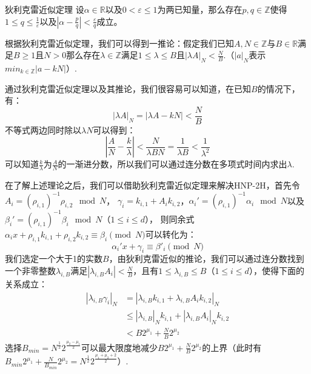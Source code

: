 \documentclass{book}
\numberwithin{equation}{subsubsection}
\begin{document}
\begin{concept}{狄利克雷近似定理}
    设$\alpha\in\mathbb{R}$以及$0<\varepsilon\le1$为两已知量，那么存在$p,q\in\mathbb{Z}$使得$1\le q\le\frac{1}{\varepsilon}$以及$|\alpha-\frac{p}{q}|<\frac{\varepsilon}{q}$成立。
\end{concept}

根据狄利克雷近似定理，我们可以得到一推论：假定我们已知$A,N\in\mathbb{Z}$与$B\in\mathbb{R}$满足$B\ge1$且$N>0$那么存在$\lambda\in\mathbb{Z}$满足$1\le\lambda\le B$且$|\lambda A|_N<\frac{N}{B}$.（$|a|_N$表示$min_{k\in\mathbb{Z}}|a-kN|$）.\par
通过狄利克雷近似定理以及其推论，我们很容易可以知道，在已知$B$的情况下，有：
\begin{equation}
    |\lambda A|_N=|\lambda A - kN|<\frac{N}{B}
    \nonumber
\end{equation}
不等式两边同时除以$\lambda N$可以得到：
\begin{equation}
    \left|\frac{A}{N} - \frac{k}{\lambda}\right|<\frac{N}{\lambda BN}=\frac{1}{\lambda B}<\frac{1}{\lambda^2}
    \nonumber
\end{equation}
可以知道$\frac{k}{\lambda}$为$\frac{A}{N}$的一渐进分数，所以我们可以通过连分数在多项式时间内求出$\lambda$.\par
在了解上述理论之后，我们可以借助狄利克雷近似定理来解决HNP-2H，首先令$A_i=(\rho_{i,1})^{-1}\rho_{i,2}\mod{N}$，
$\gamma_i=k_{i,1}+A_ik_{i,2}$，$\alpha_i'=(\rho_{i,1})^{-1}\alpha_i\mod{N}$以及$\beta_i'=(\rho_{i,1})^{-1}\beta_i\mod{N}$（$1\le i\le d$），
则同余式$\alpha_ix+\rho_{i,1}k_{i,1}+\rho_{i,2}k_{i,2}\equiv \beta_i\pmod{N}$可以转化为：
\begin{equation}
    \alpha_i'x+\gamma_i\equiv\beta'_i\pmod{N}
    \nonumber
\end{equation}
我们选定一个大于1的实数$B$，由狄利克雷近似的推论，我们可以通过连分数找到一个非零整数$\lambda_{i,B}$满足$|\lambda_{i,B}A_i|<\frac{N}{B}$，且有$1\le\lambda_{i,B}\le B$（$1\le i\le d$），使得下面的关系成立：
\begin{equation}
    \begin{aligned}
        |\lambda_{i,B}\gamma_i|_N
        &=|\lambda_{i,B}k_{i,1}+\lambda_{i,B}A_ik_{i,2}|_N\\
        &\le|\lambda_{i,B}|_Nk_{i,1}+|\lambda_{i,B}A_i|_Nk_{i,2}\\
        &<B2^{\mu_1}+\frac{N}{B}2^{\mu_2}
    \end{aligned}
    \nonumber
\end{equation}
选择$B_{min}=N^{\frac{1}{2}}2^{\frac{\mu_2-\mu_1}{2}}$可以最大限度地减少$B2^{\mu_1}+\frac{N}{B}2^{\mu_2}$的上界（此时有$B_{min}2^{\mu_1}+\frac{N}{B_{min}}2^{\mu_2}=N^{\frac{1}{2}}2^{\frac{\mu_1+\mu_2+2}{2}}$）.\par
\end{document}
